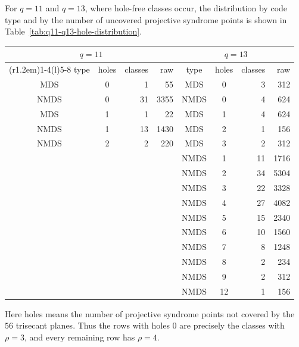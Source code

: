 ﻿\documentclass[11pt]{article}
\theoremstyle{plain}
\theoremstyle{definition}
\begin{document}
For \(q=11\) and \(q=13\), where hole-free classes occur, the distribution by
code type and by the number of uncovered projective syndrome points is shown
in Table~\ref{tab:q11-q13-hole-distribution}.
\begin{center}
\label{tab:q11-q13-hole-distribution}
\scriptsize
\begin{tabular}{c c r r@{\qquad}c c r r}
\toprule
\multicolumn{4}{c}{\(q=11\)}&
\multicolumn{4}{c}{\(q=13\)}\\
\cmidrule(r{1.2em}){1-4}\cmidrule(l){5-8}
type&holes&classes&raw&type&holes&classes&raw\\
\midrule
MDS  &0&1 &55   & MDS  &0 &3 &312\\
NMDS &0&31&3355 & NMDS &0 &4 &624\\
MDS  &1&1 &22   & MDS  &1 &4 &624\\
NMDS &1&13&1430 & MDS  &2 &1 &156\\
NMDS &2&2 &220  & MDS  &3 &2 &312\\
     & &  &     & NMDS &1 &11&1716\\
     & &  &     & NMDS &2 &34&5304\\
     & &  &     & NMDS &3 &22&3328\\
     & &  &     & NMDS &4 &27&4082\\
     & &  &     & NMDS &5 &15&2340\\
     & &  &     & NMDS &6 &10&1560\\
     & &  &     & NMDS &7 &8 &1248\\
     & &  &     & NMDS &8 &2 &234\\
     & &  &     & NMDS &9 &2 &312\\
     & &  &     & NMDS &12&1 &156\\
\bottomrule
\end{tabular}
\end{center}
Here holes means the number of projective syndrome points not covered by the
\(56\) trisecant planes.  Thus the rows with holes \(0\) are precisely the
classes with \(\rho=3\), and every remaining row has \(\rho=4\).
\end{document}
